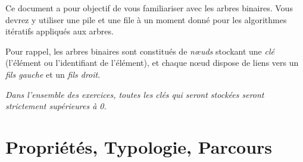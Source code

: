 \documentclass[11pt,a4paper]{article}
\begin{document}
\EncadreTitre

\bigskip


%
%

\bigskip


Ce document a pour objectif de vous familiariser avec les arbres binaires.
Vous devrez y utiliser une pile et une file à un moment donné pour les algorithmes itératifs appliqués aux arbres.

\bigskip

Pour rappel, les arbres binaires sont constitués de \textit{nœuds} stockant une \textit{clé} (l'élément ou l'identifiant de l'élément), et chaque nœud dispose de liens vers un \textit{fils gauche} et un \textit{fils droit}.

\medskip

\textit{Dans l'ensemble des exercices, toutes les clés qui seront stockées seront strictement supérieures à 0.}

\bigskip


\section{Propriétés, Typologie, Parcours}

\bigskip


\end{document}
